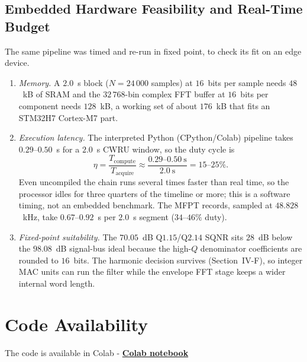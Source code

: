 \subsection{Embedded Hardware Feasibility and Real-Time Budget}
The same pipeline was timed and re-run in fixed point, to check its fit on an
edge device.
\begin{enumerate}
  \item \emph{Memory.} A $2.0$~s block ($N=24\,000$ samples) at $16$~bits per
        sample needs $48$~kB of SRAM and the $32\,768$-bin complex FFT buffer
        at $16$~bits per component needs $128$~kB, a working set of about
        $176$~kB that fits an STM32H7 Cortex-M7 part.
  \item \emph{Execution latency.} The interpreted Python (CPython/Colab)
        pipeline takes $0.29$--$0.50$~s for a $2.0$~s CWRU window, so the duty
        cycle is
\begin{equation}
  \eta = \frac{T_{\text{compute}}}{T_{\text{acquire}}}
  \approx \frac{0.29\text{--}0.50~\text{s}}{2.0~\text{s}}
  = 15\text{--}25\%.
  \label{eq:duty}
\end{equation}
        Even uncompiled the chain runs several times faster than real time, so
        the processor idles for three quarters of the timeline or more; this is
        a software timing, not an embedded benchmark. The MFPT records, sampled
        at $48.828$~kHz, take $0.67$--$0.92$~s per $2.0$~s segment
        ($34$--$46\%$ duty).
  \item \emph{Fixed-point suitability.} The $70.05$~dB Q$1.15$/Q$2.14$ SQNR
        sits $28$~dB below the $98.08$~dB signal-bus ideal because the high-$Q$
        denominator coefficients are rounded to $16$~bits. The harmonic
        decision survives (Section~IV-F), so integer MAC units can run the
        filter while the envelope FFT stage keeps a wider internal word
        length.
\end{enumerate}

\section*{Code Availability}
 The code is available in Colab - \href{https://colab.research.google.com/drive/1m9RtbRYjX3EzsLNVQcQ9l9qQvngL5N1v}{\bfseries Colab notebook}
